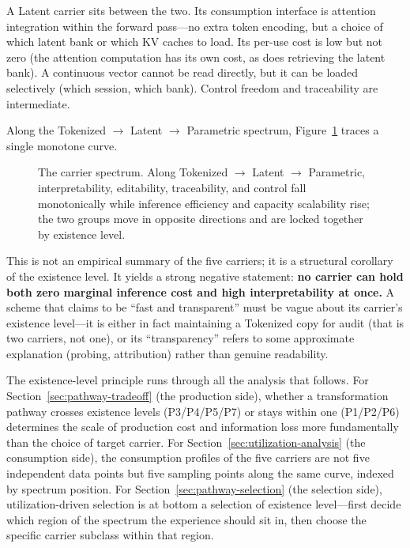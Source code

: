 A Latent carrier sits between the two. Its consumption interface is attention integration within the forward pass---no extra token encoding, but a choice of which latent bank or which KV caches to load. Its per-use cost is low but not zero (the attention computation has its own cost, as does retrieving the latent bank). A continuous vector cannot be read directly, but it can be loaded selectively (which session, which bank). Control freedom and traceability are intermediate.

Along the Tokenized $\rightarrow$ Latent $\rightarrow$ Parametric spectrum, Figure~\ref{fig:spectrum} traces a single monotone curve.

\begin{figure}[t]
\centering
{}
\caption{The carrier spectrum. Along Tokenized $\rightarrow$ Latent $\rightarrow$ Parametric, interpretability, editability, traceability, and control fall monotonically while inference efficiency and capacity scalability rise; the two groups move in opposite directions and are locked together by existence level.}
\label{fig:spectrum}
\end{figure}

This is not an empirical summary of the five carriers; it is a structural corollary of the existence level. It yields a strong negative statement: \textbf{no carrier can hold both zero marginal inference cost and high interpretability at once.} A scheme that claims to be ``fast and transparent'' must be vague about its carrier's existence level---it is either in fact maintaining a Tokenized copy for audit (that is two carriers, not one), or its ``transparency'' refers to some approximate explanation (probing, attribution) rather than genuine readability.

The existence-level principle runs through all the analysis that follows. For Section~\ref{sec:pathway-tradeoff} (the production side), whether a transformation pathway crosses existence levels (P3/P4/P5/P7) or stays within one (P1/P2/P6) determines the scale of production cost and information loss more fundamentally than the choice of target carrier. For Section~\ref{sec:utilization-analysis} (the consumption side), the consumption profiles of the five carriers are not five independent data points but five sampling points along the same curve, indexed by spectrum position. For Section~\ref{sec:pathway-selection} (the selection side), utilization-driven selection is at bottom a selection of existence level---first decide which region of the spectrum the experience should sit in, then choose the specific carrier subclass within that region.

